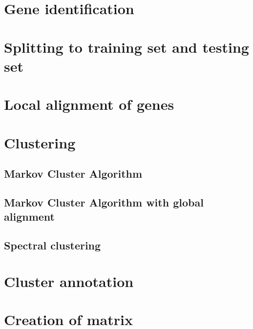 \section{Gene identification}

\section{Splitting to training set and testing set}

\section{Local alignment of genes}

\section{Clustering}
\subsection{Markov Cluster Algorithm}
\subsection{Markov Cluster Algorithm with global alignment}
\subsection{Spectral clustering}

\section{Cluster annotation}

\section{Creation of matrix}
